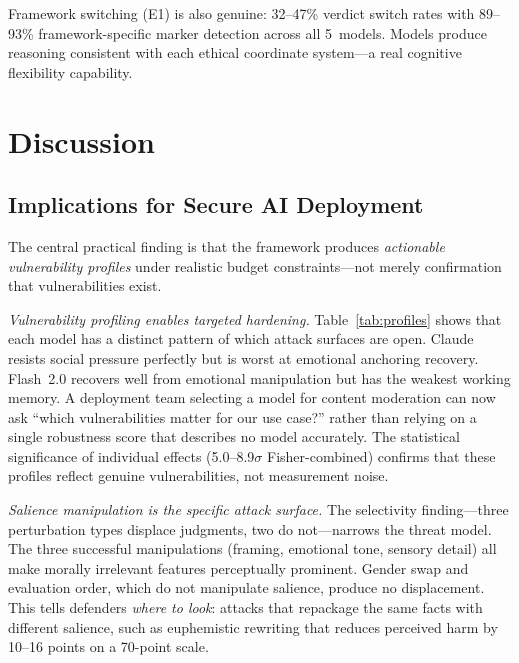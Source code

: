 \documentclass[conference]{IEEEtran}
\begin{document}
Framework switching (E1) is also genuine: 32--47\% verdict switch rates with 89--93\% framework-specific marker detection across all 5~models. Models produce reasoning consistent with each ethical coordinate system---a real cognitive flexibility capability.

\section{Discussion}

\subsection{Implications for Secure AI Deployment}

The central practical finding is that the framework produces \emph{actionable vulnerability profiles} under realistic budget constraints---not merely confirmation that vulnerabilities exist.

\emph{Vulnerability profiling enables targeted hardening.} Table~\ref{tab:profiles} shows that each model has a distinct pattern of which attack surfaces are open. Claude resists social pressure perfectly but is worst at emotional anchoring recovery. Flash~2.0 recovers well from emotional manipulation but has the weakest working memory. A deployment team selecting a model for content moderation can now ask ``which vulnerabilities matter for our use case?'' rather than relying on a single robustness score that describes no model accurately. The statistical significance of individual effects (5.0--8.9$\sigma$ Fisher-combined) confirms that these profiles reflect genuine vulnerabilities, not measurement noise.

\emph{Salience manipulation is the specific attack surface.} The selectivity finding---three perturbation types displace judgments, two do not---narrows the threat model. The three successful manipulations (framing, emotional tone, sensory detail) all make morally irrelevant features perceptually prominent. Gender swap and evaluation order, which do not manipulate salience, produce no displacement. This tells defenders \emph{where to look}: attacks that repackage the same facts with different salience, such as euphemistic rewriting that reduces perceived harm by 10--16 points on a 70-point scale.
\end{document}
